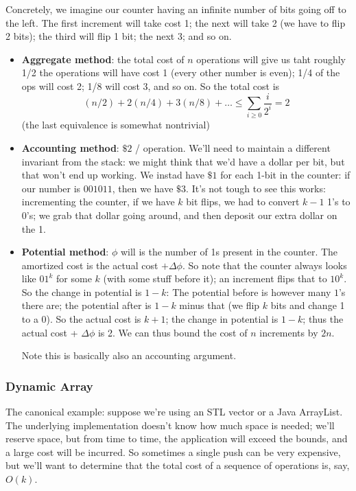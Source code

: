\documentclass{article}
\begin{document}
Concretely, we imagine our counter having an infinite number of bits going
off to the left.
The first increment will take cost 1; the next will take 2 (we have to
flip 2 bits); the third will flip 1 bit; the next 3; and so on.


\begin{itemize}

	\item
	\textbf{Aggregate method}: the total cost of $n$ operations will
	give us taht roughly 1/2 the operations will have cost 1 (every other
	number is even); 1/4 of the ops will cost 2; 1/8 will cost 3, and
	so on.
	So the total cost is
	$$
	(n/2) + 2(n/4) + 3(n/8) + \ldots
	\leq
	\sum_{i\geq 0} \frac{i}{2^i}
	 = 2
	$$
	(the last equivalence is somewhat nontrivial)
	
	\item
	\textbf{Accounting method}: $\$2$ / operation.
	We'll need to maintain a different invariant from the stack: we might
	think that we'd have a dollar per bit, but that won't end up
	working.
	We instad have $\$1$ for each 1-bit in the counter: if our number is
	$001011$, then we have $\$3$.
	It's not tough to see this works: incrementing the counter, if we have
	$k$ bit flips, we had to convert $k-1$ 1's to 0's; we grab that dollar
	going around, and then deposit our extra dollar on the 1.
	
	\item
	\textbf{Potential method}:
	$\phi$ will is the number of 1s present in the counter.
	The amortized cost is the actual cost $+ \Delta\phi$.
	So note that the counter always looks like $01^k$ for some $k$ (with
	some stuff before it);
	an increment flips that to $10^k$.
	So the change in potential is $1 - k$: The potential before is however
	many $1$'s there are; the potential after is $1 - k$ minus that (we
	flip $k$ bits and change 1 to a 0).
	So the actual cost is $k+1$; the change in potential is $1-k$;
	thus the actual cost + $\Delta\phi$ is 2.
	We can thus bound the cost of $n$ increments by $2n$.
	
	Note this is basically also an accounting argument.

\end{itemize}



\subsubsection{Dynamic Array}

The canonical example: suppose we're using an STL vector or a Java
ArrayList.
The underlying implementation doesn't know how much space is needed;
we'll reserve space, but from time to time, the application will
exceed the bounds, and a large cost will be incurred.
So sometimes a single push can be very expensive, but we'll want to 
determine that the total cost of a sequence of operations is, say, $O(k)$.
\end{document}

